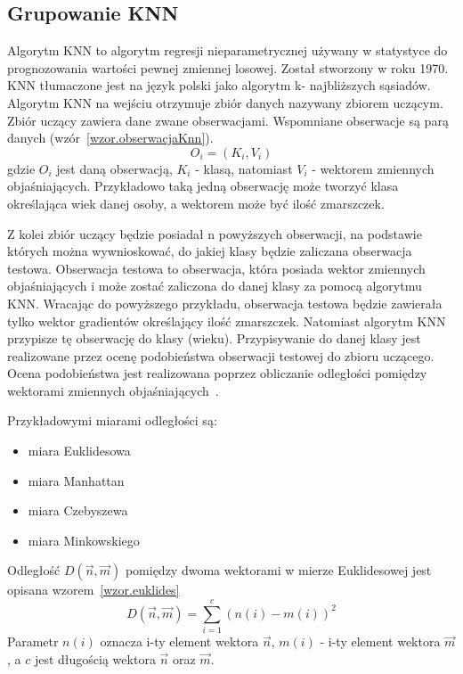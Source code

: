 \documentclass[a4paper,twoside,12pt]{book}
\begin{document}
    \subsection{Grupowanie KNN}\label{subsec:grupowanie-knn}
    Algorytm KNN to algorytm regresji
    nieparametrycznej używany w statystyce do
    prognozowania wartości pewnej zmiennej losowej. Został stworzony w roku 1970.
    KNN tłumaczone jest na język polski jako algorytm k- najbliższych sąsiadów.
    Algorytm KNN na wejściu otrzymuje zbiór danych nazywany zbiorem uczącym.
    Zbiór uczący zawiera dane zwane obserwacjami. Wspomniane obserwacje są parą danych (wzór~\ref{wzor.obserwacjaKnn}).
    \large
    \begin{equation}
        O_{i} = (K_{i}, V_{i})
        \label{wzor.obserwacjaKnn}
    \end{equation}
    \normalsize
    gdzie $O_{i}$ jest daną obserwacją, $K_{i}$ - klasą, natomiast $V_{i}$ - wektorem zmiennych objaśniających.
    Przykładowo taką jedną obserwację może tworzyć klasa określająca wiek danej osoby, a wektorem może być ilość
    zmarszczek.

    Z kolei zbiór uczący będzie posiadał n powyższych obserwacji, na podstawie których można wywnioskować, do jakiej
    klasy będzie zaliczana obserwacja testowa. Obserwacja testowa to obserwacja, która posiada wektor zmiennych
    objaśniających i może zostać zaliczona do danej klasy za pomocą algorytmu KNN.
    Wracając do powyższego przykładu, obserwacja testowa będzie zawierała tylko wektor gradientów określający ilość
    zmarszczek.
    Natomiast algorytm KNN przypisze tę obserwację do klasy (wieku).
    Przypisywanie do danej klasy jest realizowane przez ocenę podobieństwa obserwacji testowej do zbioru uczącego.
    Ocena podobieństwa jest realizowana poprzez obliczanie odległości pomiędzy wektorami zmiennych
    objaśniających~\cite{knnOpis}.

    Przykładowymi miarami odległości są:
    \begin{itemize}
        \item miara Euklidesowa
        \item miara Manhattan
        \item miara Czebyszewa
        \item miara Minkowskiego
    \end{itemize}
    Odległość $D(\overrightarrow{n},\overrightarrow{m})$ pomiędzy dwoma wektorami w mierze Euklidesowej jest opisana
    wzorem~\ref{wzor.euklides}
    \large
    \begin{equation}
        D(\overrightarrow{n},\overrightarrow{m})=\sum_{i=1}^{c}(n(i)-m(i))^{2}
        \label{wzor.euklides}
    \end{equation}
    \normalsize
    Parametr $n(i)$ oznacza i-ty element wektora $\overrightarrow{n}$,  $m(i)$ - i-ty element wektora
    $\overrightarrow{m}$, a $c$ jest długością wektora  $\overrightarrow{n}$ oraz $\overrightarrow{m}$.
\end{document}
